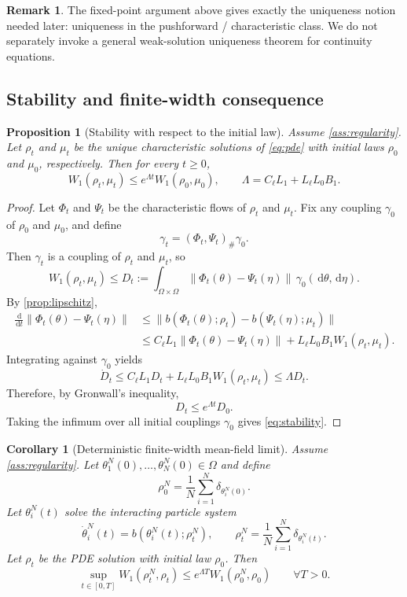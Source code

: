 \documentclass[11pt]{article}
\newtheorem{proposition}[theorem]{Proposition}
\newtheorem{corollary}[theorem]{Corollary}
\theoremstyle{definition}
\newtheorem{remark}[theorem]{Remark}
\newcommand{\W}{W_1}
\newcommand{\dd}{\,\mathrm{d}}
\begin{document}
\begin{remark}
The fixed-point argument above gives exactly the uniqueness notion needed later:
uniqueness in the pushforward / characteristic class.
We do not separately invoke a general weak-solution uniqueness theorem for continuity equations.
\end{remark}

\subsection{Stability and finite-width consequence}

\begin{proposition}[Stability with respect to the initial law]
\label{prop:stability}
Assume \cref{ass:regularity}.
Let $\rho_t$ and $\mu_t$ be the unique characteristic solutions of \eqref{eq:pde} with initial laws $\rho_0$ and $\mu_0$, respectively.
Then for every $t\ge 0$,
\begin{equation}
  \W(\rho_t,\mu_t)
  \le
  e^{\Lambda t}\W(\rho_0,\mu_0),
  \qquad
  \Lambda = C_\ell L_1 + L_\ell L_0 B_1.
  \label{eq:stability}
\end{equation}
\end{proposition}

\begin{proof}
Let $\Phi_t$ and $\Psi_t$ be the characteristic flows of $\rho_t$ and $\mu_t$.
Fix any coupling $\gamma_0$ of $\rho_0$ and $\mu_0$, and define
\[
  \gamma_t = (\Phi_t,\Psi_t)_\# \gamma_0.
\]
Then $\gamma_t$ is a coupling of $\rho_t$ and $\mu_t$, so
\[
  \W(\rho_t,\mu_t)
  \le
  D_t
  :=
  \int_{\Omega\times\Omega}
  \|\Phi_t(\theta)-\Psi_t(\eta)\|
  \,\gamma_0(\dd \theta,\dd \eta).
\]
By \cref{prop:lipschitz},
\begin{align*}
  \frac{\dd}{\dd t}
  \|\Phi_t(\theta)-\Psi_t(\eta)\|
  &\le
  \|b(\Phi_t(\theta);\rho_t)-b(\Psi_t(\eta);\mu_t)\|
  \\
  &\le
  C_\ell L_1 \|\Phi_t(\theta)-\Psi_t(\eta)\|
  +
  L_\ell L_0 B_1 \W(\rho_t,\mu_t).
\end{align*}
Integrating against $\gamma_0$ yields
\[
  \dot D_t
  \le
  C_\ell L_1 D_t
  +
  L_\ell L_0 B_1 \W(\rho_t,\mu_t)
  \le
  \Lambda D_t.
\]
Therefore, by Gronwall's inequality,
\[
  D_t \le e^{\Lambda t} D_0.
\]
Taking the infimum over all initial couplings $\gamma_0$ gives \eqref{eq:stability}.
\end{proof}

\begin{corollary}[Deterministic finite-width mean-field limit]
\label{cor:empirical-limit}
Assume \cref{ass:regularity}.
Let $\theta_1^N(0),\dots,\theta_N^N(0)\in\Omega$ and define
\[
  \rho_0^N=\frac1N\sum_{i=1}^N \delta_{\theta_i^N(0)}.
\]
Let $\theta_i^N(t)$ solve the interacting particle system
\[
  \dot \theta_i^N(t)=b(\theta_i^N(t);\rho_t^N),
  \qquad
  \rho_t^N=\frac1N\sum_{i=1}^N \delta_{\theta_i^N(t)}.
\]
Let $\rho_t$ be the PDE solution with initial law $\rho_0$.
Then
\begin{equation}
  \sup_{t\in[0,T]} \W(\rho_t^N,\rho_t)
  \le
  e^{\Lambda T}\W(\rho_0^N,\rho_0)
  \qquad \forall T>0.
  \label{eq:empirical}
\end{equation}
\end{corollary}
\end{document}
